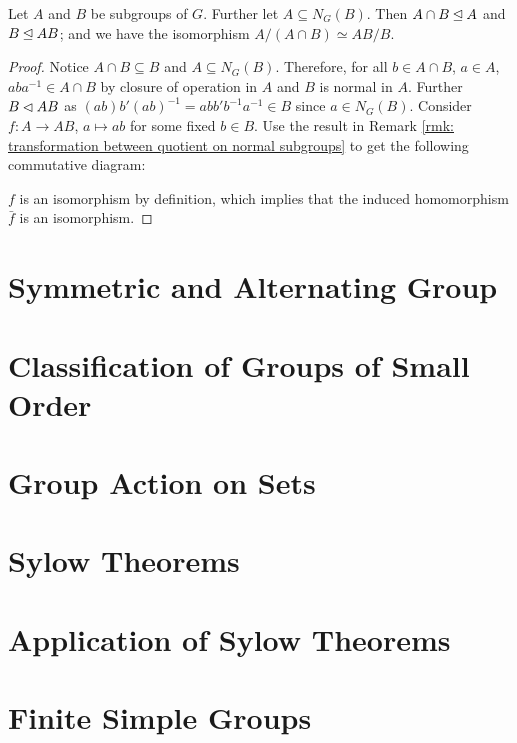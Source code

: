 \documentclass{article}
\begin{document}
\begin{theorem}
    Let $A$ and $B$ be subgroups of $G$. Further let $A \subseteq N_G(B)$. Then $A \cap B \unlhd A$ and $B \unlhd AB$; and we have the isomorphism $A/(A \cap B) \simeq AB/B$.
\end{theorem}

\begin{proof}
    Notice $A \cap B \subseteq B$ and $A \subseteq N_G(B)$. Therefore, for all $b \in A \cap B$, $a \in A$, $aba^{-1} \in A \cap B$ by closure of operation in $A$ and $B$ is normal in $A$. Further $B \lhd AB$ as $(ab) b' (ab)^{-1} = abb'b^{-1} a^{-1} \in B$ since $a \in N_G(B)$. Consider $f: A \to AB$, $a \mapsto ab$ for some fixed $b \in B$. Use the result in Remark \ref{rmk: transformation between quotient on normal subgroups} to get the following commutative diagram:

    \begin{minipage}{\linewidth}
        \centering
    \end{minipage}
    $f$ is an isomorphism by definition, which implies that the induced homomorphism $\bar{f}$ is an isomorphism.
\end{proof}

\section{Symmetric and Alternating Group}

\section{Classification of Groups of Small Order}

\section{Group Action on Sets}

\section{Sylow Theorems}

\section{Application of Sylow Theorems}

\section{Finite Simple Groups}
\end{document}
